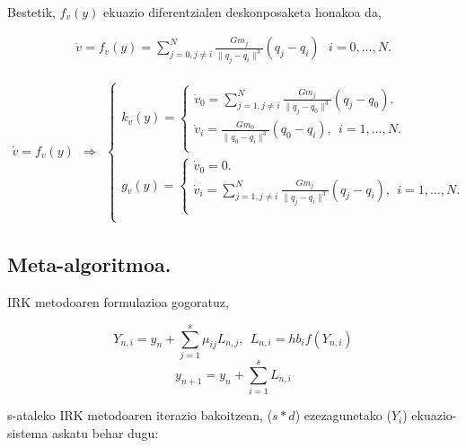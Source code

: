 \paragraph*{}Bestetik, $f_v(y)$ ekuazio diferentzialen deskonposaketa honakoa da,

\begin{align*}
\dot{v}=f_v(y)=\sum_{j=0,j \neq i}^{N} \frac{Gm_j}{\|q_j-q_i\|^3} (q_j-q_i) \ \  \ i=0,\dots,N.
\end{align*}

\begin{align}
\dot{v}=f_v(y) \ \ \Rightarrow \ \ 
\left \{ \begin{array}{c}
  k_v(y)=\left \{ \begin{array}{c}
           \dot{v}_0 =\sum_{j=1,j \neq i}^{N} \frac{Gm_j}{\|q_j-q_0\|^3} (q_j-q_0). \\[.30cm]
           \dot{v}_i = \frac{Gm_0}{\|q_0-q_i\|^3} (q_0-q_i), \ \  i=1,\dots,N.\\[.30cm]
         \end{array} \right. \\[.30cm]  
  g_v(y)=\left \{ \begin{array}{c}
             \dot{v}_0=0. \\[.30cm]
             \dot{v}_i= \sum_{j=1,j \neq i}^{N} \frac{Gm_j}{\|q_j-q_i\|^3} (q_j-q_i), \ \  i=1,\dots,N.\\[.30cm]  
           \end{array} \right. \\ 
\end{array} \right.  
\end{align}


\subsection*{Meta-algoritmoa.}

IRK metodoaren formulazioa gogoratuz,


\begin{equation*}
\label{eq:62}
Y_{n,i}=y_n+ \sum\limits_{j=1}^{s} \mu_{ij} L_{n,j}, \ \ L_{n,i}=hb_if(Y_{n,i})
\end{equation*}
\begin{equation*}
\label{eq:63}
y_{n+1}=y_n+\sum\limits_{i=1}^{s} L_{n,i}
\end{equation*}

s-ataleko IRK metodoaren iterazio bakoitzean, ($s*d$) ezezagunetako ($Y_i$) ekuazio-sistema askatu behar dugu: 

